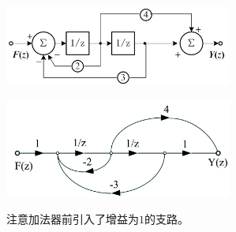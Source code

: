 \begin{Figure}[系统框图与流图的转换]
    \begin{FigureSub}[系统框图]
        \includegraphics[width=75mm]{img/7.2.png}
    \end{FigureSub}
    \begin{FigureSub}[信号流图]
        \includegraphics[width=75mm]{img/7.2-bn.png}
    \end{FigureSub}
\end{Figure}

注意加法器前引入了增益为$1$的支路。

